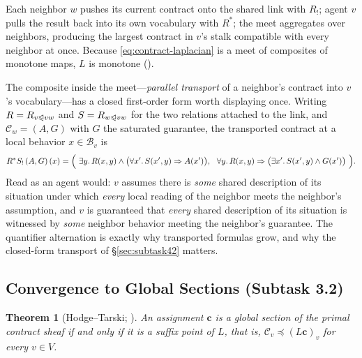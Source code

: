 \documentclass[11pt]{article}
\newif\ifshowcomments
\renewcommand{\preceq}{\preccurlyeq}
\newcommand{\face}{\trianglelefteqslant}
\newtheorem{theorem}{Theorem}
\theoremstyle{definition}
\theoremstyle{remark}
\newcommand{\prompt}[1]{%
    \ifshowcomments
        ~\todo[inline, color=techgold!80, textcolor=black,caption={Task}]{{\bf Prompt:} #1}%
    \fi
}
\begin{document}
Each neighbor $w$ pushes its current contract onto the shared link with $R_!$; agent $v$ pulls
the result back into its own vocabulary with $R^{*}$; the meet aggregates over neighbors,
producing the largest contract in $v$'s stalk compatible with every neighbor at once.
Because \eqref{eq:contract-laplacian} is a meet of composites of monotone maps, $L$ is monotone
().

The composite inside the meet---\emph{parallel transport} of a neighbor's contract into $v$'s
vocabulary---has a closed first-order form worth displaying once.
Writing $R = R_{v \face vw}$ and $S = R_{w \face vw}$ for the two relations attached to the
link, and $\mathcal{C}_w = (A, G)$ with $G$ the saturated guarantee, the transported contract
at a local behavior $x \in \mathcal{B}_v$ is
\begin{equation}
\label{eq:transport-explicit}
R^{\ast} S_{!}\,(A, G)\,(x)
 = \Bigl(\ \exists y.\, R(x,y) \wedge \bigl(\forall x'.\, S(x',y) \Rightarrow A(x')\bigr),\ \
   \forall y.\, R(x,y) \Rightarrow \bigl(\exists x'.\, S(x',y) \wedge G(x')\bigr)\ \Bigr).
\end{equation}
Read as an agent would: $v$ assumes there is \emph{some} shared description of its situation
under which \emph{every} local reading of the neighbor meets the neighbor's assumption, and $v$
is guaranteed that \emph{every} shared description of its situation is witnessed by \emph{some}
neighbor behavior meeting the neighbor's guarantee.
The quantifier alternation is exactly why transported formulas grow, and why the closed-form
transport of \S\ref{sec:subtask42} matters.

\subsection{Convergence to Global Sections (Subtask 3.2)}
\label{sec:subtask32}

\prompt{Demonstrate mathematically that the Laplacian dynamics converge to global sections,
ensuring network-wide task harmony. Deliverable: Convergence proof, included in Milestone 3's
report.}

\begin{theorem}[Hodge--Tarski; \citealp{Ghrist_2022}]
\label{thm:hodge-tarski}
An assignment $\mathbf{c}$ is a global section of the primal contract sheaf if and only if it is
a suffix point of $L$, that is, $\mathcal{C}_v \preceq (L\mathbf{c})_v$ for every $v \in V$.
\end{theorem}
\end{document}
